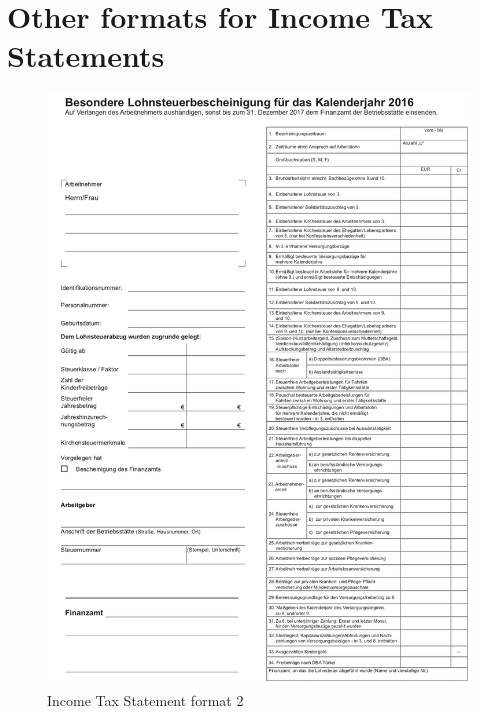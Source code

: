 \section{Other formats for Income Tax Statements}
\begin{figure}[H]
\centering
\includegraphics[scale=0.6]{images/LS-Formats/ls-format-2.png}
\caption{Income Tax Statement format 2}
\label{ls_format2}
\end{figure}
